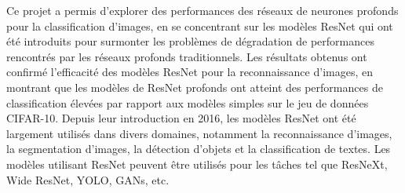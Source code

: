 \documentclass{article}
\begin{document}
Ce projet a permis d'explorer des performances des réseaux de neurones profonds pour la classification d'images,
en se concentrant sur les modèles ResNet qui ont été introduits pour surmonter les problèmes de dégradation de
performances rencontrés par les réseaux profonds traditionnels.
Les résultats obtenus ont confirmé l'efficacité des modèles ResNet pour la reconnaissance d'images, en montrant
que les modèles de ResNet profonds ont atteint des performances de classification élevées par rapport aux modèles
simples sur le jeu de données CIFAR-10.
Depuis leur introduction en 2016, les modèles ResNet ont été largement utilisés dans divers domaines, notamment
la reconnaissance d'images, la segmentation d'images, la détection d'objets et la classification de textes.
Les modèles utilisant ResNet peuvent être utilisés pour les tâches tel que ResNeXt, Wide ResNet, YOLO, GANs, etc.



\end{document}
